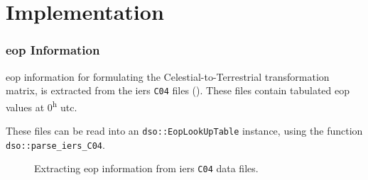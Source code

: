 \section{Implementation}
\label{eop-implementation}

\subsubsection{\gls{eop} Information}
\Gls{eop} information for formulating the Celestial-to-Terrestrial transformation 
matrix, is extracted from the \gls{iers} \texttt{C04} files (\cite{Bizouard2019}).
These files contain tabulated \gls{eop} values at 0\textsuperscript{h} \gls{utc}. 

These files can be read into an \texttt{dso::EopLookUpTable} instance, using 
the function \texttt{dso::parse\_iers\_C04}.


\begin{figure}
\centering

\caption{Extracting \gls{eop} information from \gls{iers} \texttt{C04} data files.}
\label{fig:handling-eop}
\end{figure}
